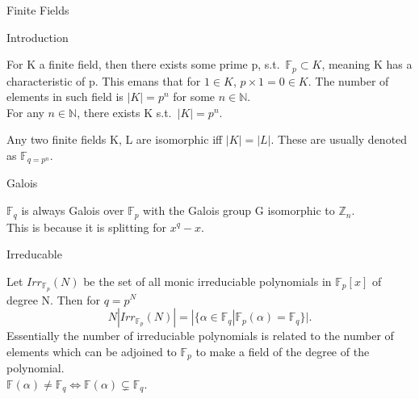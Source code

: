 \documentclass[12pt, letterpaper]{article}
\newcommand{\Z}{\mathbb{Z}}
\newcommand{\F}{\mathbb{F}}
\newcommand{\N}{\mathbb{N}}
\begin{document}
\begin{section}{Finite Fields}

  \begin{subsection}{Introduction}

    For K a finite field, then there exists some prime p, s.t.\
    \(\F_{p} \subset K\), meaning K has a characteristic of p. This emans that
    for \(1 \in K\), \(p \times 1 = 0 \in K\). The number of elements in such
    field is \(| K | = p^{n}\) for some \(n \in \N\). \\
    For any \(n \in \N\), there exists K s.t.\ \(| K | = p^{n}\).

    Any two finite fields K, L are isomorphic iff \(| K | = | L |\). These are
    usually denoted as \(\F_{q = p^{n}}\).

    \begin{subsubsection}{Galois}

      \(\F_{q}\) is always Galois over \(\F_{p}\) with the Galois group G
      isomorphic to \(\Z_{n}\). \\
      This is because it is splitting for \(x^{q} - x\).

    \end{subsubsection}

  \end{subsection}

  \begin{subsection}{Irreducable}

    Let \(Irr_{\F_{p}}(N)\) be the set of all monic irreduciable polynomials in
    \(\F_{p}[x]\) of degree N. Then for \(q = p^{N}\) \[N | Irr_{\F_{p}}(N) |
      = | \{ \alpha \in \F_{q} | \F_{p}(\alpha) = \F_{q}\} |.\] Essentially the
    number of irreduciable polynomials is related to the number of elements
    which can be adjoined to \(\F_{p}\) to make a field of the degree of the
    polynomial. \\
    \(\F(\alpha) \neq \F_{q} \iff \F(\alpha) \subsetneq \F_{q}\).

  \end{subsection}

\end{section}
\end{document}
